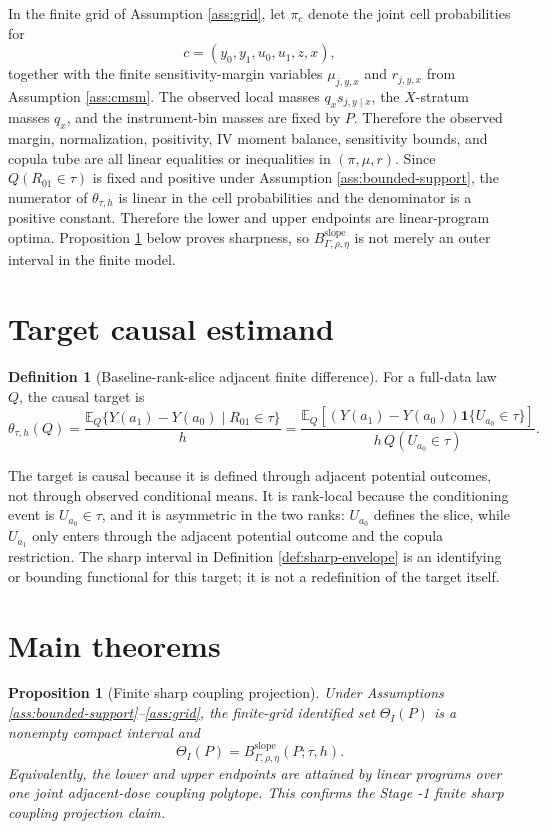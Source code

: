 \documentclass[11pt]{article}
\newcommand{\E}{\mathbb{E}}
\newcommand{\one}{\mathbf{1}}
\theoremstyle{definition}
\newtheorem{definition}{Definition}
\theoremstyle{plain}
\newtheorem{proposition}{Proposition}
\theoremstyle{remark}
\begin{document}
In the finite grid of Assumption \ref{ass:grid}, let \(\pi_c\) denote the joint cell probabilities for
\[
c=(y_0,y_1,u_0,u_1,z,x),
\]
together with the finite sensitivity-margin variables \(\mu_{j,y,x}\) and \(r_{j,y,x}\) from Assumption \ref{ass:cmsm}.  The observed local masses \(q_xs_{j,y\mid x}\), the \(X\)-stratum masses \(q_x\), and the instrument-bin masses are fixed by \(P\).  Therefore the observed margin, normalization, positivity, IV moment balance, sensitivity bounds, and copula tube are all linear equalities or inequalities in \((\pi,\mu,r)\).  Since \(Q(R_{01}\in\tau)\) is fixed and positive under Assumption \ref{ass:bounded-support}, the numerator of \(\theta_{\tau,h}\) is linear in the cell probabilities and the denominator is a positive constant.  Therefore the lower and upper endpoints are linear-program optima.  Proposition \ref{prop:lp-sharpness} below proves sharpness, so \(B_{\Gamma,\rho,\eta}^{\mathrm{slope}}\) is not merely an outer interval in the finite model.

\section{Target causal estimand}
\begin{definition}[Baseline-rank-slice adjacent finite difference]\label{def:target}
For a full-data law \(Q\), the causal target is
\[
\theta_{\tau,h}(Q)
=
\frac{\E_Q\{Y(a_1)-Y(a_0)\mid R_{01}\in\tau\}}{h}
=
\frac{
\E_Q\left[(Y(a_1)-Y(a_0))\one\{U_{a_0}\in\tau\}\right]
}{
h\,Q(U_{a_0}\in\tau)
}.
\]
\end{definition}

The target is causal because it is defined through adjacent potential outcomes, not through observed conditional means.  It is rank-local because the conditioning event is \(U_{a_0}\in\tau\), and it is asymmetric in the two ranks: \(U_{a_0}\) defines the slice, while \(U_{a_1}\) only enters through the adjacent potential outcome and the copula restriction.  The sharp interval in Definition \ref{def:sharp-envelope} is an identifying or bounding functional for this target; it is not a redefinition of the target itself.

\section{Main theorems}
\begin{proposition}[Finite sharp coupling projection]\label{prop:lp-sharpness}
Under Assumptions \ref{ass:bounded-support}--\ref{ass:grid}, the finite-grid identified set \(\Theta_I(P)\) is a nonempty compact interval and
\[
\Theta_I(P)=B_{\Gamma,\rho,\eta}^{\mathrm{slope}}(P;\tau,h).
\]
Equivalently, the lower and upper endpoints are attained by linear programs over one joint adjacent-dose coupling polytope.  This confirms the Stage -1 finite sharp coupling projection claim.
\end{proposition}
\end{document}
